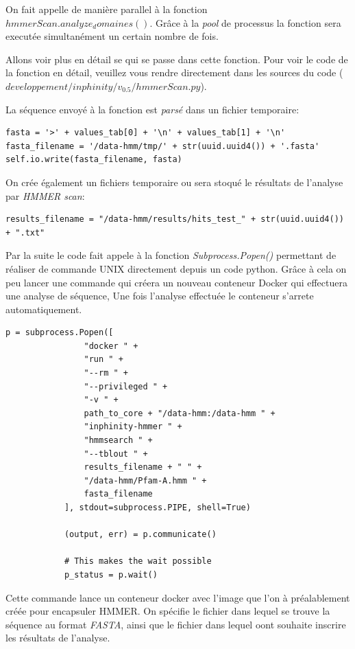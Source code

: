 On fait appelle de manière parallel à la fonction \emph{$hmmerScan.analyze_domaines()$}. Grâce à la \emph{pool} de processus la fonction sera executée simultanément un certain nombre de fois.

Allons voir plus en détail se qui se passe dans cette fonction. Pour voir le code de la fonction en détail, veuillez vous rendre directement dans les sources du code (\emph{$developpement/inphinity/v_0.5/hmmerScan.py$}).

La séquence envoyé à la fonction est \emph{parsé} dans un fichier temporaire:

\begin{lstlisting}[frame=single]
fasta = '>' + values_tab[0] + '\n' + values_tab[1] + '\n'
fasta_filename = '/data-hmm/tmp/' + str(uuid.uuid4()) + '.fasta'
self.io.write(fasta_filename, fasta)
\end{lstlisting} 

On crée également un fichiers temporaire ou sera stoqué le résultats de l'analyse par \emph{HMMER scan}:

\begin{lstlisting}[frame=single]
results_filename = "/data-hmm/results/hits_test_" + str(uuid.uuid4()) + ".txt"
\end{lstlisting} 

Par la suite le code fait appele à la fonction \emph{Subprocess.Popen()} permettant de réaliser de commande UNIX directement depuis un code python. Grâce à cela on peu lancer une commande qui créera un nouveau conteneur Docker qui effectuera une analyse de séquence, Une fois l'analyse effectuée le conteneur s'arrete automatiquement.


\begin{lstlisting}[frame=single]
p = subprocess.Popen([
                "docker " +
                "run " +
                "--rm " +
                "--privileged " +
                "-v " +
                path_to_core + "/data-hmm:/data-hmm " +
                "inphinity-hmmer " +
                "hmmsearch " +
                "--tblout " +
                results_filename + " " +
                "/data-hmm/Pfam-A.hmm " +
                fasta_filename
            ], stdout=subprocess.PIPE, shell=True)

            (output, err) = p.communicate()

            # This makes the wait possible
            p_status = p.wait()
\end{lstlisting} 

Cette commande lance un conteneur docker avec l'image que l'on à préalablement créée pour encapsuler HMMER. On spécifie le fichier dans lequel se trouve la séquence au format \emph{FASTA}, ainsi que le fichier dans lequel oont souhaite inscrire les résultats de l'analyse.


